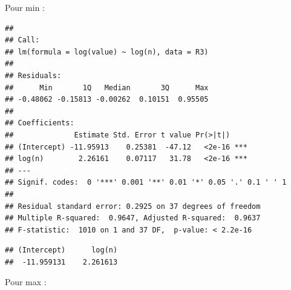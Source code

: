 \documentclass[
]{article}
\newenvironment{Shaded}{\begin{snugshade}}{\end{snugshade}}
\newcommand{\AttributeTok}[1]{\textcolor[rgb]{0.77,0.63,0.00}{#1}}
\newcommand{\DecValTok}[1]{\textcolor[rgb]{0.00,0.00,0.81}{#1}}
\newcommand{\FunctionTok}[1]{\textcolor[rgb]{0.00,0.00,0.00}{#1}}
\newcommand{\NormalTok}[1]{#1}
\newcommand{\OtherTok}[1]{\textcolor[rgb]{0.56,0.35,0.01}{#1}}
\newcommand{\SpecialCharTok}[1]{\textcolor[rgb]{0.00,0.00,0.00}{#1}}
\newcommand{\StringTok}[1]{\textcolor[rgb]{0.31,0.60,0.02}{#1}}
\begin{document}
Pour min :

\begin{Shaded}
\end{Shaded}

\begin{verbatim}
## 
## Call:
## lm(formula = log(value) ~ log(n), data = R3)
## 
## Residuals:
##      Min       1Q   Median       3Q      Max 
## -0.48062 -0.15813 -0.00262  0.10151  0.95505 
## 
## Coefficients:
##              Estimate Std. Error t value Pr(>|t|)    
## (Intercept) -11.95913    0.25381  -47.12   <2e-16 ***
## log(n)        2.26161    0.07117   31.78   <2e-16 ***
## ---
## Signif. codes:  0 '***' 0.001 '**' 0.01 '*' 0.05 '.' 0.1 ' ' 1
## 
## Residual standard error: 0.2925 on 37 degrees of freedom
## Multiple R-squared:  0.9647, Adjusted R-squared:  0.9637 
## F-statistic:  1010 on 1 and 37 DF,  p-value: < 2.2e-16
\end{verbatim}

\begin{Shaded}
\end{Shaded}

\begin{verbatim}
## (Intercept)      log(n) 
##  -11.959131    2.261613
\end{verbatim}

Pour max :

\begin{Shaded}
\end{Shaded}
\end{document}
